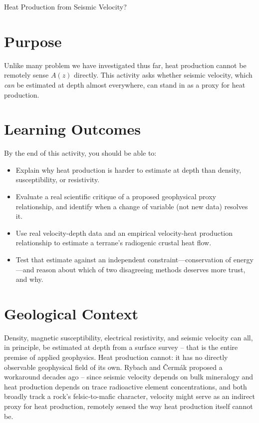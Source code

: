 \begin{activity}{Heat Production from Seismic Velocity?}

\section*{Purpose}
Unlike many problem we have investigated thus far, heat production cannot be remotely sense $A(z)$ directly. This activity asks whether seismic velocity, which \emph{can} be estimated at depth almost everywhere, can stand in as a proxy for heat production. 

\section*{Learning Outcomes}

By the end of this activity, you should be able to:
\begin{itemize}
  \item Explain why heat production is harder to estimate at depth than density, susceptibility, or resistivity.
  \item Evaluate a real scientific critique of a proposed geophysical proxy relationship, and identify when a change of variable (not new data) resolves it.
  \item Use real velocity-depth data and an empirical velocity-heat production relationship to estimate a terrane's radiogenic crustal heat flow.
  \item Test that estimate against an independent constraint---conservation of energy---and reason about which of two disagreeing methods deserves more trust, and why.
\end{itemize}

\section*{Geological Context}
Density, magnetic susceptibility, electrical resistivity, and seismic velocity can all, in principle, be estimated at depth from a surface survey -- that is the entire premise of applied geophysics. Heat production cannot: it has no directly observable geophysical field of its own. Rybach and \v{C}erm\'{a}k proposed a workaround decades ago -- since seismic velocity depends on bulk mineralogy and heat production depends on trace radioactive element concentrations, and both broadly track a rock's felsic-to-mafic character, velocity might serve as an indirect proxy for heat production, remotely sensed the way heat production itself cannot be.


\end{activity}
